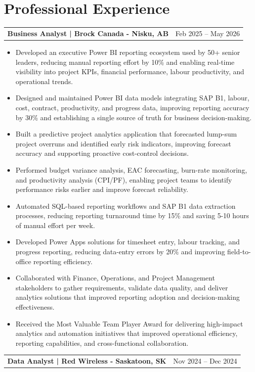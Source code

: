 \documentclass[10.5pt,letterpaper]{article}
\makeatletter
\newcommand{\resumeRow}[2]{%
  \noindent\begin{tabularx}{\linewidth}{@{}X r@{}}
    \textbf{#1} & #2 \\
  \end{tabularx}%
}
\makeatother
\begin{document}
\section{Professional Experience}
\resumeRow{Business Analyst | Brock Canada - Nisku, AB}{Feb 2025 -- May 2026}
\begin{itemize}
  \item Developed an executive Power BI reporting ecosystem used by 50+ senior leaders, reducing manual reporting effort by 10\% and enabling real-time visibility into project KPIs, financial performance, labour productivity, and operational trends.
  \item Designed and maintained Power BI data models integrating SAP B1, labour, cost, contract, productivity, and progress data, improving reporting accuracy by 30\% and establishing a single source of truth for business decision-making.
  \item Built a predictive project analytics application that forecasted lump-sum project overruns and identified early risk indicators, improving forecast accuracy and supporting proactive cost-control decisions.
  \item Performed budget variance analysis, EAC forecasting, burn-rate monitoring, and productivity analysis (CPI/PF), enabling project teams to identify performance risks earlier and improve forecast reliability.
  \item Automated SQL-based reporting workflows and SAP B1 data extraction processes, reducing reporting turnaround time by 15\% and saving 5-10 hours of manual effort per week.
  \item Developed Power Apps solutions for timesheet entry, labour tracking, and progress reporting, reducing data-entry errors by 20\% and improving field-to-office reporting efficiency.
  \item Collaborated with Finance, Operations, and Project Management stakeholders to gather requirements, validate data quality, and deliver analytics solutions that improved reporting adoption and decision-making effectiveness.
  \item Received the Most Valuable Team Player Award for delivering high-impact analytics and automation initiatives that improved operational efficiency, reporting capabilities, and cross-functional collaboration.
\end{itemize}
\resumeRow{Data Analyst | Red Wireless - Saskatoon, SK}{Nov 2024 -- Dec 2024}
\end{document}
